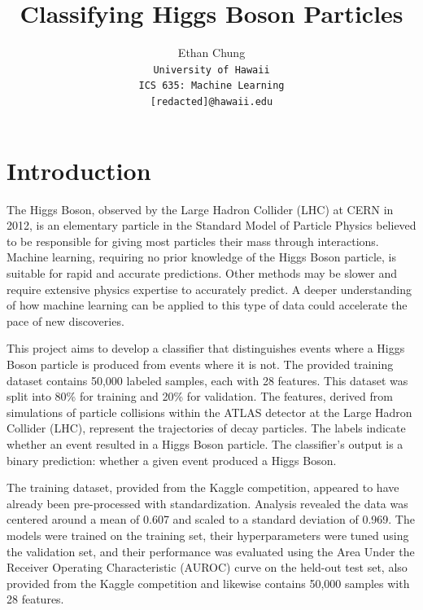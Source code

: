 \documentclass[letterpaper]{article}
\begin{document}
	\title{Classifying Higgs Boson Particles}
	
	\author{Ethan Chung\\
		{\tt\small University of Hawaii}\\
		{\tt\small ICS 635: Machine Learning}\\
		{\tt\small [redacted]@hawaii.edu}}
	
	\maketitle
	
	\section{Introduction}
	
	The Higgs Boson, observed by the Large Hadron Collider (LHC) at CERN in 2012, is an elementary particle in the Standard Model of Particle Physics believed to be responsible for giving most particles their mass through interactions. Machine learning, requiring no prior knowledge of the Higgs Boson particle, is suitable for rapid and accurate predictions. Other methods may be slower and require extensive physics expertise to accurately predict. A deeper understanding of how machine learning can be applied to this type of data could accelerate the pace of new discoveries.
	
	This project aims to develop a classifier that distinguishes events where a Higgs Boson particle is produced from events where it is not. The provided training dataset contains 50,000 labeled samples, each with 28 features. This dataset was split into 80\% for training and 20\% for validation. The features, derived from simulations of particle collisions within the ATLAS detector at the Large Hadron Collider (LHC), represent the trajectories of decay particles. The labels indicate whether an event resulted in a Higgs Boson particle. The classifier's output is a binary prediction: whether a given event produced a Higgs Boson.
	
	The training dataset, provided from the Kaggle competition, appeared to have already been pre-processed with standardization. Analysis revealed the data was centered around a mean of 0.607 and scaled to a standard deviation of 0.969. The models were trained on the training set, their hyperparameters were tuned using the validation set, and their performance was evaluated using the Area Under the Receiver Operating Characteristic (AUROC) curve on the held-out test set, also provided from the Kaggle competition and likewise contains 50,000 samples with 28 features.
	
\end{document}
